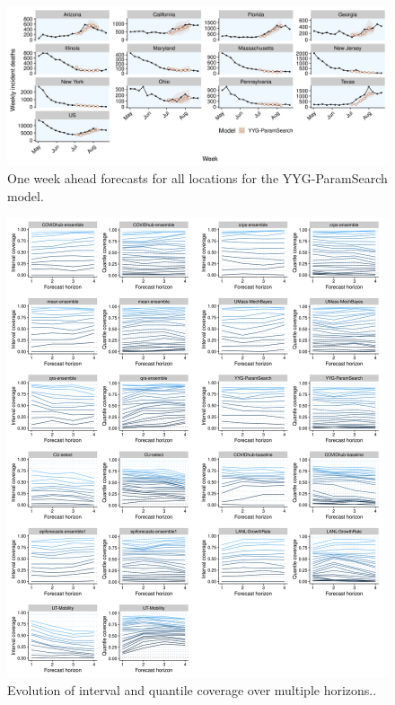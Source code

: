 \documentclass[
]{book}
\begin{document}
\begin{figure}
\includegraphics[width=1\linewidth]{../visualisation/chapter-5-results/scenario-baseline/APPENDIX-YYG-ParamSearch-forecasts} \caption{One week ahead forecasts for all locations for the YYG-ParamSearch  model.}\label{fig:predictions-yyg-paramsearch}
\end{figure}

\begin{figure}
\includegraphics[width=1\linewidth]{../visualisation/chapter-5-results/scenario-baseline/APPENDIX-coverage-plots-horizons} \caption{Evolution of interval and quantile coverage over multiple horizons..}\label{fig:coverage-horizons}
\end{figure}


  
\end{document}
